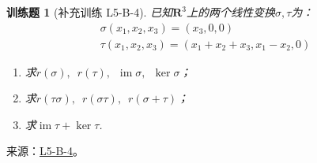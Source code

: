 \documentclass[UTF8,12pt,a4paper,fontset=fandol]{ctexart}
\newtheorem{exercise}{训练题}[section]
\begin{document}
\begin{exercise}[补充训练 L5-B-4]\label{prob:L5-B-4}
已知$\mathbf{R}^3$上的两个线性变换$\sigma,\tau$为：
        \begin{gather*}
            \sigma(x_1,x_2,x_3)=(x_3,0,0) \\
            \tau(x_1,x_2,x_3)=(x_1+x_2+x_3,x_1-x_2,0)
        \end{gather*}
        \begin{enumerate}
            \item 求$r(\sigma),\enspace r(\tau),\enspace \operatorname{im}\sigma,\enspace \ker\sigma$；

            \item 求$r(\tau\sigma),\enspace r(\sigma\tau),\enspace r(\sigma+\tau)$；

            \item 求$\operatorname{im}\tau+\ker\tau$.
        \end{enumerate}
\end{exercise}
\noindent 来源：\href{https://github.com/yhwu-is/Linear-Algebra-Left-Undone/blob/new/%E8%AE%B2%E4%B9%89/%E4%B8%93%E9%A2%98/5%20%E7%BA%BF%E6%80%A7%E6%98%A0%E5%B0%84.tex}{L5-B-4}。
\end{document}
